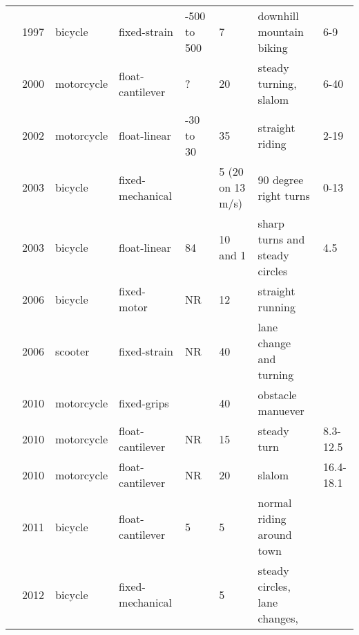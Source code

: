 \documentclass[10pt]{article}
\begin{document}
\begin{landscape}
\begin{table}
\begin{tabular}{llllllll}
    \cite{Lorenzo1997,Lorenzo1999}        &  1997 &     bicycle &      fixed-strain &       -500 to 500 &                        7 &                downhill mountain biking &         6-9 \\
    \cite{Bortoluzzi2000,Biral2003}       &  2000 &  motorcycle &  float-cantilever &                 ? &                       20 &                  steady turning, slalom &        6-40 \\
    \cite{James2002a,James2002,James2005} &  2002 &  motorcycle &      float-linear &         -30 to 30 &                       35 &                         straight riding &        2-19 \\
    \cite{Cheng2003}                      &  2003 &     bicycle &  fixed-mechanical &                   &         5 (20 on 13 m/s) &                   90 degree right turns &        0-13 \\
    \cite{Cheng2003}                      &  2003 &     bicycle &      float-linear &                84 &                 10 and 1 &          sharp turns and steady circles &         4.5 \\
    \cite{Iuchi2006}                      &  2006 &     bicycle &       fixed-motor &                NR &                       12 &                        straight running &             \\
    \cite{Capitani2006}                   &  2006 &     scooter &      fixed-strain &                NR &                       40 &                 lane change and turning &             \\
    \cite{Evertse2010}                    &  2010 &  motorcycle &       fixed-grips &                   &                       40 &                       obstacle manuever &             \\
    \cite{Teerhuis2010}                   &  2010 &  motorcycle &  float-cantilever &                NR &                       15 &                             steady turn &    8.3-12.5 \\
    \cite{Teerhuis2010}                   &  2010 &  motorcycle &  float-cantilever &                NR &                       20 &                                  slalom &   16.4-18.1 \\
    \cite{Ouden2011}                      &  2011 &     bicycle &  float-cantilever &                 5 &                        5 &               normal riding around town &             \\
    \cite{Moore2012}                      &  2012 &     bicycle &  fixed-mechanical &                   &                        5 &          steady circles, lane changes,  &             \\

\end{tabular}
\end{table}
\end{landscape}
\end{document}
